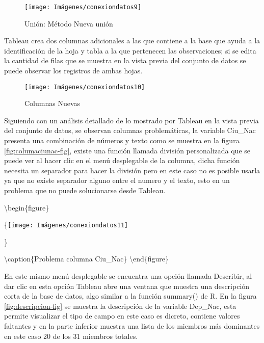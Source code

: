 \documentclass[
]{book}
\begin{document}
\begin{figure}

{\centering \texttt{[image: Imágenes/conexiondatos9]} 

}

\caption{Unión: Método Nueva unión}\label{fig:unionnueva-fig}
\end{figure}

Tableau crea dos columnas adicionales a las que contiene a la base que ayuda a la identificación de la hoja y tabla a la que pertenecen las observaciones; si se edita la cantidad de filas que se muestra en la vista previa del conjunto de datos se puede observar los registros de ambas hojas.

\begin{figure}

{\centering \texttt{[image: Imágenes/conexiondatos10]} 

}

\caption{Columnas Nuevas}\label{fig:nuevascolumnas-fig}
\end{figure}

Siguiendo con un análisis detallado de lo mostrado por Tableau en la vista previa del conjunto de datos, se observan columnas problemáticas, la variable Ciu\_Nac presenta una combinación de números y texto como se muestra en la figura \ref{fig:columaciunac-fig}, existe una función llamada división personalizada que se puede ver al hacer clic en el menú desplegable de la columna, dicha función necesita un separador para hacer la división pero en este caso no es posible usarla ya que no existe separador alguno entre el numero y el texto, esto en un problema que no puede solucionarse desde Tableau.

\textbackslash begin\{figure\}

\{\centering \texttt{[image: Imágenes/conexiondatos11]}

\}

\textbackslash caption\{Problema columna Ciu\_Nac\}\label{fig:columaciunac-fig}
\textbackslash end\{figure\}

En este mismo menú desplegable se encuentra una opción llamada Describir, al dar clic en esta opción Tableau abre una ventana que muestra una descripción corta de la base de datos, algo similar a la función summary() de R. En la figura \ref{fig:descripcion-fig} se muestra la descripción de la variable Dep\_Nac, esta permite visualizar el tipo de campo en este caso es dicreto, contiene valores faltantes y en la parte inferior muestra una lista de los miembros más dominantes en este caso 20 de los 31 miembros totales.
\end{document}
